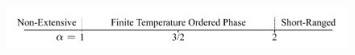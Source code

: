 \hypertarget{fig:alpha_diagram}{%
\begin{figure}
\centering
\includegraphics[width=1\textwidth,height=\textheight]{figure_code/background_chapter/alpha_diagram}
\caption[{Long Range Ising Model Behaviour}]{}
\label{fig:alpha_diagram}
\end{figure}
}

\begin{Shaded}
\begin{Highlighting}[]

\end{Highlighting}
\end{Shaded}
